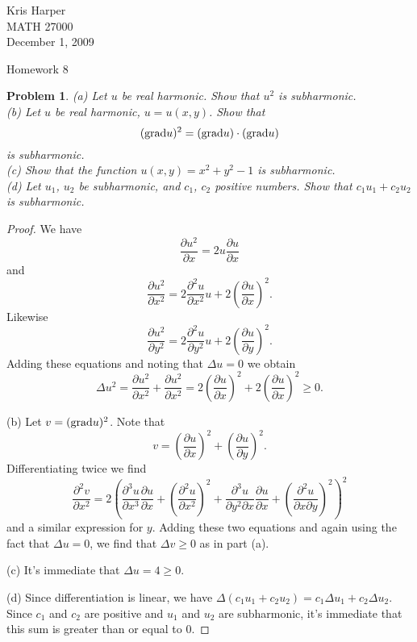 \documentclass{article}
\newtheorem{problem}{Problem}
\begin{document}
\begin{flushright}
Kris Harper\\

MATH 27000\\

December 1, 2009
\end{flushright}

\begin{center}
Homework 8
\end{center}

\begin{problem}
(a) Let $u$ be real harmonic. Show that $u^2$ is subharmonic.\\
(b) Let $u$ be real harmonic, $u = u(x,y)$. Show that
\[
(\textup{grad} u)^2 = (\textup{grad} u) \cdot (\textup{grad}u)
\]
is subharmonic.\\
(c) Show that the function $u(x,y) = x^2 + y^2 - 1$ is subharmonic.\\
(d) Let $u_1$, $u_2$ be subharmonic, and $c_1$, $c_2$ positive numbers. Show that $c_1 u_1 + c_2 u_2$ is subharmonic.
\end{problem}
\begin{proof}
We have
\[
\frac{\partial u^2}{\partial x} = 2 u \frac{\partial u}{\partial x}
\]
and
\[
\frac{\partial u^2}{\partial x^2} = 2 \frac{\partial^2 u}{\partial x^2} u + 2 \left ( \frac{\partial u}{\partial x} \right )^2.
\]
Likewise
\[
\frac{\partial u^2}{\partial y^2} = 2 \frac{\partial^2 u}{\partial y^2} u + 2 \left ( \frac{\partial u}{\partial y} \right )^2.
\]
Adding these equations and noting that $\Delta u = 0$ we obtain
\[
\Delta u^2 = \frac{\partial u^2}{\partial x^2} + \frac{\partial u^2}{\partial x^2} = 2 \left ( \frac{\partial u}{\partial x} \right )^2 + 2 \left ( \frac{\partial u}{\partial x} \right )^2 \geq 0.
\]

(b) Let $v = (\textup{grad} u)^2$. Note that
\[
v = \left ( \frac{\partial u}{\partial x} \right )^2 + \left ( \frac{\partial u}{\partial y} \right )^2.
\]
Differentiating twice we find
\[
\frac{\partial^2 v}{\partial x^2} = 2 \left ( \frac{\partial^3 u}{\partial x^3} \frac{\partial u}{\partial x} + \left ( \frac{\partial^2 u}{\partial x^2} \right )^2 + \frac{\partial^3 u}{\partial y^2 \partial x} \frac{\partial u}{\partial x} + \left ( \frac{\partial^2 u}{\partial x \partial y} \right )^2 \right )^2
\]
and a similar expression for $y$. Adding these two equations and again using the fact that $\Delta u = 0$, we find that $\Delta v \geq 0$ as in part (a).

(c) It's immediate that $\Delta u = 4 \geq 0$.

(d) Since differentiation is linear, we have $\Delta (c_1 u_1 + c_2 u_2) = c_1 \Delta u_1 + c_2 \Delta u_2$. Since $c_1$ and $c_2$ are positive and $u_1$ and $u_2$ are subharmonic, it's immediate that this sum is greater than or equal to $0$.
\end{proof}
\end{document}
